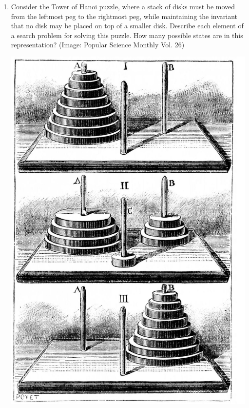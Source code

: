 \documentclass[11pt]{article}
\begin{document}
\begin{enumerate}

\item
Consider the Tower of Hanoi puzzle, where a stack of disks
must be moved from the leftmost peg to the rightmost peg, while maintaining
the invariant that no disk may be placed on top of a smaller disk.
Describe each element of a
search problem for solving this puzzle. How many possible states are in
this representation? (Image: Popular Science Monthly Vol. 26)

\includegraphics[scale=0.15, right]{img/hanoi}


\end{enumerate}
\end{document}
